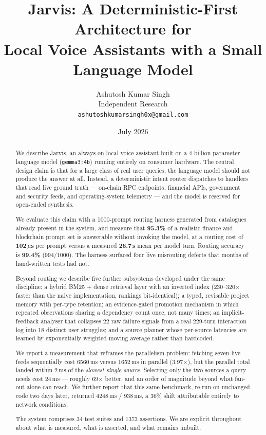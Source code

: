 \documentclass[10pt,twocolumn]{article}
\title{\vspace{-1.5em}\textbf{Jarvis: A Deterministic-First Architecture for\\
Local Voice Assistants with a Small Language Model}}
\author{
  Ashutosh Kumar Singh\\
  \small Independent Research\\
  \small \texttt{ashutoshkumarsingh0x@gmail.com}
}
\date{July 2026}
\newcommand{\code}[1]{\texttt{\small #1}}
\begin{document}
\maketitle

\begin{abstract}
\noindent
We describe Jarvis, an always-on local voice assistant built on a 4-billion-parameter
language model (\code{gemma3:4b}) running entirely on consumer hardware. The central
design claim is that for a large class of real user queries, the language model should
not produce the answer at all. Instead, a deterministic intent router dispatches to
handlers that read live ground truth --- on-chain RPC endpoints, financial APIs,
government and security feeds, and operating-system telemetry --- and the model is
reserved for open-ended synthesis.

We evaluate this claim with a 1000-prompt routing harness generated from catalogues
already present in the system, and measure that \textbf{95.3\%} of a realistic finance
and blockchain prompt set is answerable without invoking the model, at a routing cost of
\textbf{102\,$\mu$s} per prompt versus a measured \textbf{26.7\,s} mean per model turn.
Routing accuracy is \textbf{99.4\%} (994/1000). The harness surfaced four live
misrouting defects that months of hand-written tests had not.

Beyond routing we describe five further subsystems developed under the same discipline:
a hybrid BM25 + dense retrieval layer with an inverted index (230--320$\times$ faster
than the naive implementation, rankings bit-identical); a typed, revisable project
memory with per-type retention; an evidence-gated promotion mechanism in which repeated
observations sharing a dependency count once, not many times; an implicit-feedback
analyser that collapses 22 raw failure signals from a real 229-turn interaction log into
18 distinct user struggles; and a source planner whose per-source latencies are learned
by exponentially weighted moving average rather than hardcoded.

We report a measurement that reframes the parallelism problem: fetching seven live feeds
sequentially cost 6560\,ms versus 1652\,ms in parallel (3.97$\times$), but the parallel
total landed within 2\,ms of the \emph{slowest single source}. Selecting only the two
sources a query needs cost 24\,ms --- roughly 69$\times$ better, and an order of
magnitude beyond what fan-out alone can reach. We further report that this same
benchmark, re-run on unchanged code two days later, returned 4248\,ms / 938\,ms, a 36\%
shift attributable entirely to network conditions.

The system comprises 34 test suites and 1373 assertions. We are explicit throughout
about what is measured, what is asserted, and what remains unbuilt.
\end{abstract}
\end{document}
